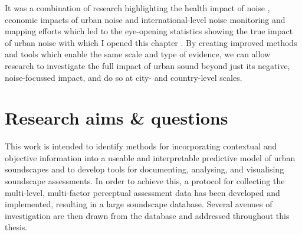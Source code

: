 It was a combination of research highlighting the health impact of noise \citep{Ising2004Health}, economic impacts of urban noise \citep{Bristow2014International,Galilea2005Valuing} and international-level noise monitoring and mapping efforts which led to the eye-opening statistics showing the true impact of urban noise with which I opened this chapter \citep{EEA2020Environmental}. By creating improved methods and tools which enable the same scale and type of evidence, we can allow research to investigate the full impact of urban sound beyond just its negative, noise-focussed impact, and do so at city- and country-level scales.





\section{Research aims \& questions}
This work is intended to identify methods for incorporating contextual and objective information into a useable and interpretable predictive model of urban soundscapes and to develop tools for documenting, analysing, and visualising soundscape assessments. In order to achieve this, a protocol for collecting the multi-level, multi-factor perceptual assessment data has been developed and implemented, resulting in a large soundscape database. Several avenues of investigation are then drawn from the database and addressed throughout this thesis.

